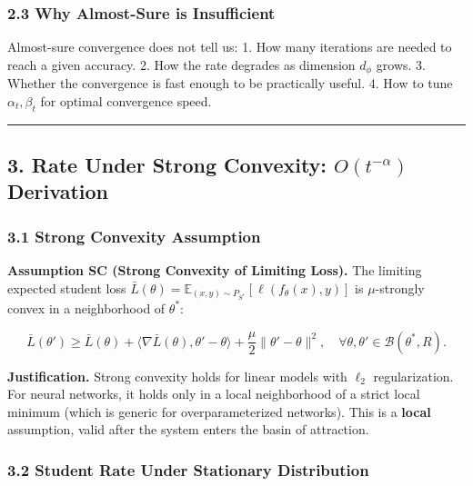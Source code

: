 \documentclass[
  12pt,
]{article}
\begin{document}
\subsubsection{2.3 Why Almost-Sure is
Insufficient}\label{why-almost-sure-is-insufficient}

Almost-sure convergence does not tell us: 1. How many iterations are
needed to reach a given accuracy. 2. How the rate degrades as dimension
\(d_\phi\) grows. 3. Whether the convergence is fast enough to be
practically useful. 4. How to tune \(\alpha_t, \beta_t\) for optimal
convergence speed.

\begin{center}\rule{0.5\linewidth}{0.5pt}\end{center}

\subsection{\texorpdfstring{3. Rate Under Strong Convexity:
\(O(t^{-\alpha})\)
Derivation}{3. Rate Under Strong Convexity: O(t\^{}\{-\textbackslash alpha\}) Derivation}}\label{rate-under-strong-convexity-ot-alpha-derivation}

\subsubsection{3.1 Strong Convexity
Assumption}\label{strong-convexity-assumption}

\textbf{Assumption SC (Strong Convexity of Limiting Loss).} The limiting
expected student loss
\(\bar{L}(\theta) = \mathbb{E}_{(x,y) \sim P_{S^*}}[\ell(f_\theta(x), y)]\)
is \(\mu\)-strongly convex in a neighborhood of \(\theta^*\):

\[\bar{L}(\theta') \geq \bar{L}(\theta) + \langle \nabla \bar{L}(\theta), \theta' - \theta \rangle + \frac{\mu}{2} \|\theta' - \theta\|^2, \quad \forall \theta, \theta' \in \mathcal{B}(\theta^*, R).\]

\textbf{Justification.} Strong convexity holds for linear models with
\(\ell_2\) regularization. For neural networks, it holds only in a local
neighborhood of a strict local minimum (which is generic for
overparameterized networks). This is a \textbf{local} assumption, valid
after the system enters the basin of attraction.

\subsubsection{3.2 Student Rate Under Stationary
Distribution}\label{student-rate-under-stationary-distribution}
\end{document}
